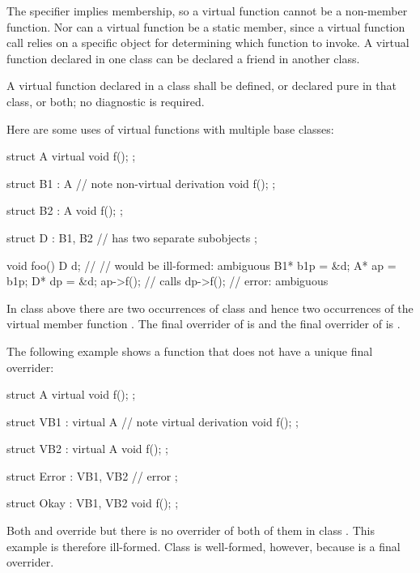 \pnum
\begin{note}
The  specifier implies membership, so a virtual function
cannot be a non-member function. Nor can a virtual
function be a static member, since a virtual function call relies on a
specific object for determining which function to invoke. A virtual
function declared in one class can be declared a friend in
another class.
\end{note}

\pnum
{}%
A virtual function declared in a class shall be defined, or declared
pure in that class, or both; no diagnostic is
required.
%

\pnum
{}%
\begin{example}
Here are some uses of virtual functions with multiple base classes:
\begin{codeblock}
struct A {
  virtual void f();
};

struct B1 : A {                 // note non-virtual derivation
  void f();
};

struct B2 : A {
  void f();
};

struct D : B1, B2 {             //  has two separate  subobjects
};

void foo() {
  D   d;
//                  // would be ill-formed: ambiguous
  B1*  b1p = &d;
  A*   ap = b1p;
  D*   dp = &d;
  ap->f();                      // calls 
  dp->f();                      // error: ambiguous
}
\end{codeblock}
In class  above there are two occurrences of class 
and hence two occurrences of the virtual member function .
The final overrider of  is  and the final
overrider of  is .
\end{example}

\pnum
\begin{example}
The following example shows a function that does not have a unique final
overrider:
\begin{codeblock}
struct A {
  virtual void f();
};

struct VB1 : virtual A {        // note virtual derivation
  void f();
};

struct VB2 : virtual A {
  void f();
};

struct Error : VB1, VB2 {       // error
};

struct Okay : VB1, VB2 {
  void f();
};
\end{codeblock}
Both  and  override  but there
is no overrider of both of them in class . This example is
therefore ill-formed. Class  is well-formed, however,
because  is a final overrider.
\end{example}

